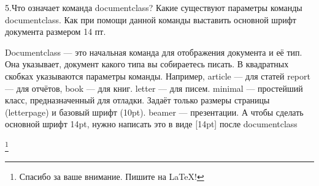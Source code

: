 \documentclass{article}
\begin{document}
5.Что означает команда documentclass? Какие существуют параметры команды documentclass. Как при помощи данной команды выставить основной шрифт документа размером 14 пт.

Documentclass --- это начальная команда для отображения документа и её тип. Она указывает, документ какого типа вы собираетесь писать. В квадратных скобках указываются параметры команды. Например, article — для статей
report — для отчётов, book — для книг. letter — для писем. minimal — простейший класс, предназначенный для отладки. Задаёт только размеры страницы (letterpage) и базовый шрифт (10pt). beamer — презентации. А чтобы сделать основной шрифт 14pt, нужно написать это в виде [14pt] после documentclass


\thanks{Спасибо за ваше внимание. Пишите на \LaTeX{}!}
\end{document}
